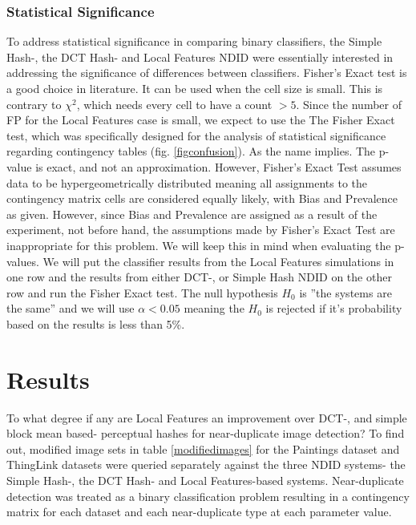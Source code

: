 \documentclass[english,12pt,a4paper,pdftex,elec,utf8, table]{aaltothesis}
\begin{document}
\subsubsection{Statistical Significance}
To address statistical significance in comparing binary classifiers, the Simple Hash-, the DCT Hash- and Local Features NDID were essentially interested in addressing the significance of differences between classifiers. Fisher's Exact test is a good choice in literature. It can be used when the cell size is small. This is contrary to $\chi^2$, which needs every cell to have a count $>5$. Since the number of FP for the Local Features case is small, we expect to use the The Fisher Exact test, which was specifically designed for the analysis of statistical significance regarding contingency tables (fig. \ref{figconfusion}). As the name implies. The p-value is exact, and not an approximation. \cite{fisher1922interpretation}
However, Fisher's Exact Test assumes data to be hypergeometrically distributed meaning all assignments to the contingency matrix cells are considered equally likely, with Bias and Prevalence as given. However, since Bias and Prevalence are assigned as a result of the experiment, not before hand, the assumptions made by Fisher's Exact Test are inappropriate for this problem. We will keep this in mind when evaluating the p-values.
We will put the classifier results from the Local Features simulations in one row and the results from either DCT-, or Simple Hash NDID on the other row and run the Fisher Exact test. The null hypothesis $H_0$ is ''the systems are the same'' and we will use $\alpha < 0.05$ meaning the $H_0$ is rejected if it's probability based on the results is less than 5\%.

\clearpage

\section{Results}\label{results}
To what degree if any are Local Features an improvement over DCT-, and simple block mean based- perceptual hashes for near-duplicate image detection? To find out, modified image sets in table \ref{modifiedimages} for the Paintings dataset and ThingLink datasets were queried separately against the three NDID systems- the Simple Hash-, the DCT Hash- and Local Features-based systems. Near-duplicate detection was treated as a binary classification problem resulting in a contingency matrix for each dataset and each near-duplicate type at each parameter value.
\end{document}
